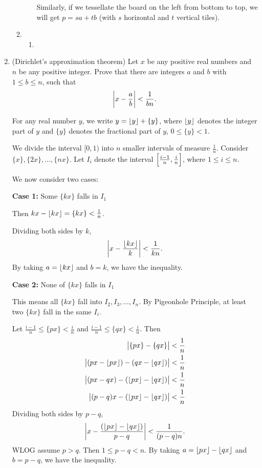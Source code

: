 \begin{enumerate}
\begin{solution}
\begin{enumerate}[label=(\roman*)]
\begin{enumerate}[label=(\alph*)]
    Similarly, if we tessellate the board on the left from bottom to top, we will get $p=sa+tb$ (with $s$ horizontal and $t$ vertical tiles).
\end{enumerate}

\item \begin{enumerate}[label=(\alph*)]
    \item 
\end{enumerate}
\end{enumerate}
\end{solution}

\item (Dirichlet's approximation theorem) Let $x$ be any positive real numbers and $n$ be any positive integer. Prove that there are integers $a$ and $b$ with $1 \le b \le n$, such that
\[ \left|x-\frac{a}{b}\right|<\frac{1}{bn}. \]

\begin{solution}
For any real number $y$, we write $y=\left\lfloor y \right\rfloor+\{y\}$, where $\left\lfloor y \right\rfloor$ denotes the integer part of $y$ and $\{y\}$ denotes the fractional part of $y$, $0\le \{y\}<1$.

We divide the interval $[0,1)$ into $n$ smaller intervals of measure $\frac{1}{n}$. Consider $\{x\},\{2x\},\dots,\{nx\}$. Let $I_i$ denote the interval $\left[\frac{i-1}{n},\frac{i}{n}\right]$, where $1\le i\le n$.

We now consider two cases:

\textbf{Case 1:} Some $\{kx\}$ falls in $I_1$

Then $kx-\left\lfloor kx \right\rfloor=\{kx\}<\frac{1}{n}$.

Dividing both sides by $k$,
\[ \left|x-\frac{\left\lfloor kx \right\rfloor}{k}\right|<\frac{1}{kn}. \]
By taking $a=\left\lfloor kx \right\rfloor$ and $b=k$, we have the inequality.

\textbf{Case 2:} None of $\{kx\}$ falls in $I_1$

This means all $\{kx\}$ fall into $I_2,I_3,\dots,I_n$. By Pigeonhole Principle, at least two $\{kx\}$ fall in the same $I_i$.

Let $\frac{i-1}{n}\le\{px\}<\frac{i}{n}$ and $\frac{i-1}{n}\le\{qx\}<\frac{i}{n}$. Then
\begin{align*}
\left|\{px\}-\{qx\}\right| &< \frac{1}{n} \\
\left|(px-\left\lfloor px \right\rfloor)-(qx-\left\lfloor qx \right\rfloor)\right| &< \frac{1}{n} \\
\left|(px-qx)-(\left\lfloor px \right\rfloor-\left\lfloor qx \right\rfloor)\right| &< \frac{1}{n} \\
\left|(p-q)x-(\left\lfloor px \right\rfloor-\left\lfloor qx \right\rfloor)\right| &< \frac{1}{n}
\end{align*}
Dividing both sides by $p-q$,
\[ \left|x-\frac{(\left\lfloor px \right\rfloor-\left\lfloor qx \right\rfloor)}{p-q}\right|<\frac{1}{(p-q)n}. \]
WLOG assume $p>q$. Then $1\le p-q<n$. By taking $a=\left\lfloor px \right\rfloor-\left\lfloor qx \right\rfloor$ and $b=p-q$, we have the inequality.
\end{solution}


\end{enumerate}
